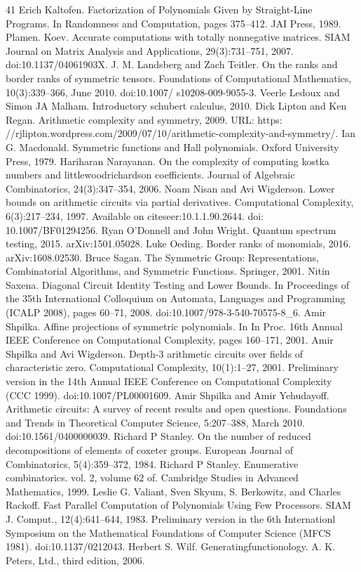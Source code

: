 \documentclass[10pt,a4paper]{article}
\theoremstyle{definition}
\begin{document}
\begin{thebibliography}{41}
 Erich Kaltofen. Factorization of Polynomials Given by Straight-Line Programs. In Randomness and Computation, pages 375–412. JAI Press, 1989.
 Plamen. Koev. Accurate computations with totally nonnegative matrices. SIAM Journal on Matrix Analysis and Applications, 29(3):731–751, 2007. doi:10.1137/04061903X.
 J. M. Landsberg and Zach Teitler. On the ranks and border ranks of symmetric tensors. Foundations of Computational Mathematics, 10(3):339–366, June 2010. doi:10.1007/ s10208-009-9055-3.
 Veerle Ledoux and Simon JA Malham. Introductory schubert calculus, 2010.
 Dick Lipton and Ken Regan. Arithmetic complexity and symmetry, 2009. URL: https: //rjlipton.wordpress.com/2009/07/10/arithmetic-complexity-and-symmetry/.
 Ian G. Macdonald. Symmetric functions and Hall polynomials. Oxford University Press, 1979.
 Hariharan Narayanan. On the complexity of computing kostka numbers and littlewoodrichardson coefficients. Journal of Algebraic Combinatorics, 24(3):347–354, 2006.
 Noam Nisan and Avi Wigderson. Lower bounds on arithmetic circuits via partial derivatives. Computational Complexity, 6(3):217–234, 1997. Available on citeseer:10.1.1.90.2644. doi: 10.1007/BF01294256.
 Ryan O’Donnell and John Wright. Quantum spectrum testing, 2015. arXiv:1501.05028.
 Luke Oeding. Border ranks of monomials, 2016. arXiv:1608.02530.
 Bruce Sagan. The Symmetric Group: Representations, Combinatorial Algorithms, and Symmetric Functions. Springer, 2001.
 Nitin Saxena. Diagonal Circuit Identity Testing and Lower Bounds. In Proceedings of the 35th International Colloquium on Automata, Languages and Programming (ICALP 2008), pages 60–71, 2008. doi:10.1007/978-3-540-70575-8\_6.
 Amir Shpilka. Affine projections of symmetric polynomials. In In Proc. 16th Annual IEEE Conference on Computational Complexity, pages 160–171, 2001.
 Amir Shpilka and Avi Wigderson. Depth-3 arithmetic circuits over fields of characteristic zero. Computational Complexity, 10(1):1–27, 2001. Preliminary version in the 14th Annual IEEE Conference on Computational Complexity (CCC 1999). doi:10.1007/PL00001609.
 Amir Shpilka and Amir Yehudayoff. Arithmetic circuits: A survey of recent results and open questions. Foundations and Trends in Theoretical Computer Science, 5:207–388, March 2010. doi:10.1561/0400000039.
 Richard P Stanley. On the number of reduced decompositions of elements of coxeter groups. European Journal of Combinatorics, 5(4):359–372, 1984.
 Richard P Stanley. Enumerative combinatorics. vol. 2, volume 62 of. Cambridge Studies in Advanced Mathematics, 1999.
 Leslie G. Valiant, Sven Skyum, S. Berkowitz, and Charles Rackoff. Fast Parallel Computation of Polynomials Using Few Processors. SIAM J. Comput., 12(4):641–644, 1983. Preliminary version in the 6th Internationl Symposium on the Mathematical Foundations of Computer Science (MFCS 1981). doi:10.1137/0212043.
 Herbert S. Wilf. Generatingfunctionology. A. K. Peters, Ltd., third edition, 2006.
\end{thebibliography}
\end{document}
